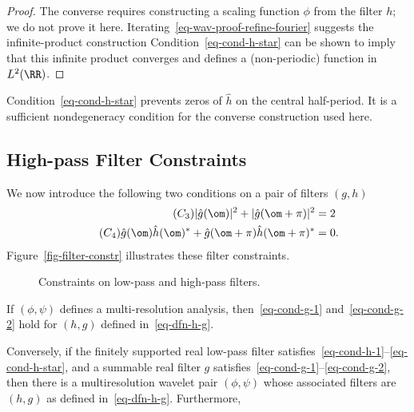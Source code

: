 \begin{proof}
  
The converse requires constructing a scaling function $\phi$ from the filter $h$; we do not prove it here. Iterating~\eqref{eq-wav-proof-refine-fourier} suggests the infinite-product construction
Condition~\eqref{eq-cond-h-star} can be shown to imply that this infinite product converges and defines a (non-periodic) function in $L^2(\RR)$.
\end{proof}


Condition~\eqref{eq-cond-h-star} prevents zeros of $\hat h$ on the central half-period. It is a sufficient nondegeneracy condition for the converse construction used here.

                                   
\subsection{High-pass Filter Constraints}

We now introduce the following two conditions on a pair of filters $(g,h)$
\begin{align}
	\label{eq-cond-g-1}\tag{$C_3$}  |\hat g(\om)|^2 + |\hat g(\om+\pi)|^2&=2  \\
	\label{eq-cond-g-2}\tag{$C_4$}   \hat g(\om) \hat h(\om)^* + \hat g(\om+\pi) \hat h(\om+\pi)^*&=0.
\end{align}
Figure~\ref{fig-filter-constr} illustrates these filter constraints.

\begin{figure}[tbp]
\centering
{}
\caption{Constraints on low-pass and high-pass filters.}
\label{fig-filter-constr}
\label{fig-filters-complements}
\end{figure}



\begin{thm}\label{thm-wave-h}
	If $(\phi,\psi)$ defines a multi-resolution analysis, then~\eqref{eq-cond-g-1} and~\eqref{eq-cond-g-2} hold for $(h,g)$ defined in~\eqref{eq-dfn-h-g}.
	 
	Conversely, if the finitely supported real low-pass filter satisfies~\eqref{eq-cond-h-1}--\eqref{eq-cond-h-star}, and a summable real filter $g$ satisfies~\eqref{eq-cond-g-1}--\eqref{eq-cond-g-2}, then there is a multiresolution wavelet pair $(\phi,\psi)$ whose associated filters are $(h,g)$ as defined in~\eqref{eq-dfn-h-g}. Furthermore,
\end{thm}

